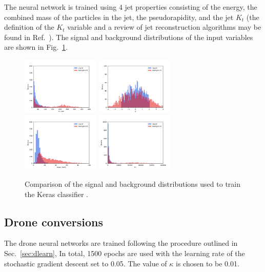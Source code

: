 \documentclass[final,5p,times,twocolumn]{elsarticle}
\begin{document}
The neural network is trained using 4 jet properties consisting of the energy,
the combined mass of the particles in the jet, the pseudorapidity, and the jet $K_t$ (the definition
of the $K_t$ variable and a review of jet reconstruction algorithms
may be found in Ref.~\cite{Atkin:2015msa}).
The signal and background distributions of the input variables
are shown in Fig.~\ref{fig:inputsGPD}.
%
\begin{figure}[t]
\centering
\includegraphics[width=0.33\textwidth]{et_comp_gpd}
\includegraphics[width=0.33\textwidth]{eta_comp_gpd}
\includegraphics[width=0.33\textwidth]{m_comp_gpd}
\includegraphics[width=0.33\textwidth]{kt_comp_gpd}
\caption{\small Comparison of the signal and background distributions
used to train the Keras classifier .}
\label{fig:inputsGPD}
\end{figure}

\subsection{Drone conversions}

The drone neural networks are trained following the procedure outlined in Sec.~\ref{sec:dlearn},
In total, 1500 epochs are used with
the learning rate of the stochastic gradient descent set to 0.05.
The value of $\kappa$ is chosen to be 0.01.
\end{document}
